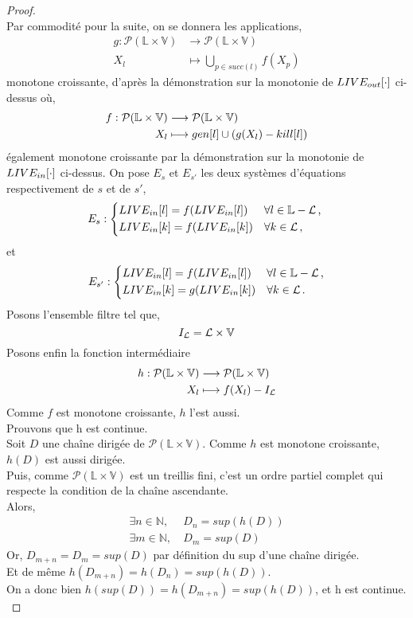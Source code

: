 \documentclass[a4paper, 10pt]{article}
\begin{document}
\begin{proof}
	\\ 
	Par commodité pour la suite, on se donnera les applications,
	\begin{align*}
		g : \mathcal{P}(\mathbb{L} \times \mathbb{V}) &\longrightarrow \mathcal{P}(\mathbb{L} \times \mathbb{V})\\
		X_l &\longmapsto \bigcup\limits_{p\in succ(l)} f(X_p)
	\end{align*}
	monotone croissante, d'après la démonstration sur la monotonie de $LIVE_{out}[\cdot]$ ci-dessus où,
	\begin{align*}
		f : \mathcal{P}(\mathbb{L} \times \mathbb{V}) &\longrightarrow \mathcal{P}(\mathbb{L} \times \mathbb{V})\\
		X_l &\longmapsto gen[l] \cup (g(X_l) - kill[l])
	\end{align*}
	également monotone croissante par la démonstration sur la monotonie de $LIVE_{in}[\cdot]$ ci-dessus.
	On pose $E_s$ et $E_{s'}$ les deux systèmes d'équations respectivement de $s$ et de $s'$,
	\[
	E_s :
	\begin{dcases*}
		\livein{l} = f(\livein{l}) &$\forall l \in \mathbb{L} - \mathcal{L}$\,, \\
		\livein{k} = f(\livein{k}) &$\forall k \in \mathcal{L}$\,,
	\end{dcases*}
	\]
	et
	\[
	E_{s'} :
	\begin{dcases*}
		\livein{l} = f(\livein{l}) &$\forall l \in \mathbb{L} - \mathcal{L}$\,,\\
		\livein{k} = g(\livein{k}) &$\forall k \in \mathcal{L}$\,.
	\end{dcases*}
	\]
	Posons l'ensemble filtre tel que,
	\[
		I_{\mathcal{L}} = \mathcal{L} \times \mathbb{V}
	\]
	Posons enfin la fonction intermédiaire
	\begin{align*}
	h : \mathcal{P}(\mathbb{L} \times \mathbb{V}) &\longrightarrow \mathcal{P}(\mathbb{L} \times \mathbb{V})\\
	X_l &\longmapsto f(X_l) - I_{\mathcal{L}}
	\end{align*}
	Comme $f$ est monotone croissante, $h$ l'est aussi.
	\\

	\noindent
	Prouvons que h est continue.
	\\
	Soit $D$ une chaîne dirigée de $\mathcal{P}(\mathbb{L} \times \mathbb{V})$.
	Comme $h$ est monotone croissante, $h(D)$ est aussi dirigée.
	\\
	Puis, comme $\mathcal{P}(\mathbb{L} \times \mathbb{V})$ est un treillis fini, c'est un ordre partiel complet qui respecte la condition de la chaîne ascendante.
	\\
	Alors,
	\begin{align*}
		\exists n \in \mathbb{N},\ &D_n = sup(h(D)) \\
		\exists m \in \mathbb{N},\ &D_m = sup(D)
	\end{align*}
	Or, $D_{m+n} = D_m = sup(D)$ par définition du sup d'une chaîne dirigée.
	\\
	Et de même $h(D_{m+n}) = h(D_n) = sup(h(D))$.
	\\
	On a donc bien $h(sup(D)) = h(D_{m+n}) = sup(h(D))$, et h est continue.
	\\


\end{proof}
\end{document}
